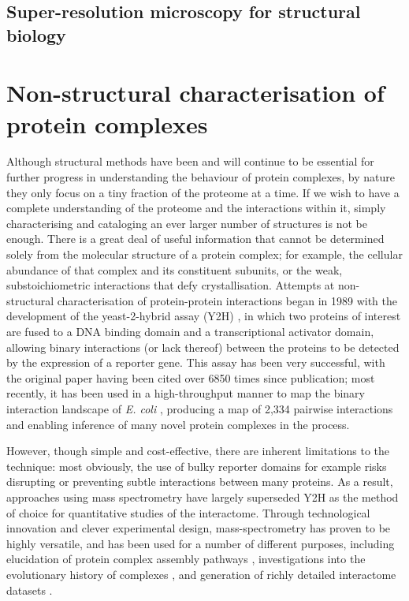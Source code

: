 \documentclass[a4paper,11pt,twoside,openright]{scrbook}
\begin{document}
\subsection{Super-resolution microscopy for structural biology}

\section{Non-structural characterisation of protein complexes}
Although structural methods have been and will continue to be essential for further progress in understanding the behaviour of protein complexes, by nature they only focus on a tiny fraction of the proteome at a time. If we wish to have a complete understanding of the proteome and the interactions within it, simply characterising and cataloging an ever larger number of structures is not be enough. There is a great deal of useful information that cannot be determined solely from the molecular structure of a protein complex; for example, the cellular abundance of that complex and its constituent subunits, or the weak, substoichiometric interactions that defy crystallisation. Attempts at non-structural characterisation of protein-protein interactions began in 1989 with the development of the yeast-2-hybrid assay (Y2H) \cite{Fields1989}, in which two proteins of interest are fused to a DNA binding domain and a transcriptional activator domain, allowing binary interactions (or lack thereof) between the proteins to be detected by the expression of a reporter gene. This assay has been very successful, with the original paper having been cited over 6850 times since publication; most recently, it has been used in a high-throughput manner to map the binary interaction landscape of \textit{E. coli} \cite{Rajagopala2014}, producing a map of 2,334 pairwise interactions and enabling inference of many novel protein complexes in the process.

However, though simple and cost-effective, there are inherent limitations to the technique: most obviously, the use of bulky reporter domains for example risks disrupting or preventing subtle interactions between many proteins. As a result, approaches using mass spectrometry have largely superseded Y2H as the method of choice for quantitative studies of the interactome. Through technological innovation and clever experimental design, mass-spectrometry has proven to be highly versatile, and has been used for a number of different purposes, including elucidation of protein complex assembly pathways \cite{Levy2008a,Marsh2013}, investigations into the evolutionary history of complexes \cite{Wan2015}, and generation of richly detailed interactome datasets \cite{Hein2015}.
\end{document}

